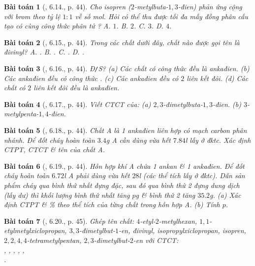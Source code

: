 \documentclass{article}
\newtheorem{baitoan}{Bài toán}
\begin{document}
\begin{baitoan}[\cite{SBT_Hoa_Hoc_11_co_ban}, 6.14., p. 44]
	Cho isopren ($2$-metylbuta-$1,3$-đien) phản ứng cộng với brom theo tỷ lệ $1:1$ về số mol. Hỏi có thể thu được tối đa mấy đồng phân cấu tạo có cùng công thức phân tử \emph{}? {\sf A.} $1$. {\sf B.} $2$. {\sf C.} $3$. {\sf D.} $4$.
\end{baitoan}

\begin{baitoan}[\cite{SBT_Hoa_Hoc_11_co_ban}, 6.15., p. 44]
	Trong các chất dưới đây, chất nào được gọi tên là \emph{đivinyl}? {\sf A.} \emph{}. {\sf B.} \emph{}. {\sf C.} \emph{}. {\sf D.} \emph{}.
\end{baitoan}

\begin{baitoan}[\cite{SBT_Hoa_Hoc_11_co_ban}, 6.16., p. 44]
	\emph{Đ\texttt{/}S?} (a) Các chất có công thức \emph{} đều là ankađien. (b) Các ankađien đều có công thức \emph{}. (c) Các ankađien đều có $2$ liên kết đôi. (d) Các chất có $2$ liên kết đôi đều là ankađien.
\end{baitoan}

\begin{baitoan}[\cite{SBT_Hoa_Hoc_11_co_ban}, 6.17., p. 44]
	Viết CTCT của: (a) $2,3$-đimetylbuta-$1,3$-đien. (b) $3$-metylpenta-$1,4$-đien.
\end{baitoan}

\begin{baitoan}[\cite{SBT_Hoa_Hoc_11_co_ban}, 6.18., p. 44]
	Chất A là 1 ankađien liên hợp có mạch carbon phân nhánh. Để đốt cháy hoàn toàn $3.4$\emph{g} A cần dùng vừa hết $7.84$\emph{l} \emph{} lấy ở đktc. Xác định CTPT, CTCT \& tên của chất A.
\end{baitoan}

\begin{baitoan}[\cite{SBT_Hoa_Hoc_11_co_ban}, 6.19., p. 44]
	Hỗn hợp khí A chứa 1 ankan \& 1 ankađien. Để đốt cháy hoàn toàn $6.72$\emph{l} A phải dùng vừa hết $28$\emph{l} \emph{} (các thể tích lấy ở đktc). Dẫn sản phẩm cháy qua bình thứ nhất đựng \emph{} đặc, sau đó qua bình thứ 2 đựng dung dịch \emph{} (lấy dư) thì khối lượng bình thứ nhất tăng $p$\emph{g} \& bình thứ 2 tăng $35.2$\emph{g}. (a) Xác định CTPT \& \% theo thể tích của từng chất trong hỗn hợp A. (b) Tính $p$.
\end{baitoan}

\begin{baitoan}[\cite{SBT_Hoa_Hoc_11_co_ban}, 6.20., p. 45]
	Ghép tên chất: $4$-etyl-$2$-metylhexan, $1,1$-etylmetylxiclopropan, $3,3$-đimetylbut-$1$-en, đivinyl, isopropylxiclopropan, isopren, $2,2,4,4$-tetrametylpentan, $2,3$-đimetylbut-$2$-en với CTCT:\\\emph{,  , , , },\\\emph{}.
\end{baitoan}
\end{document}

